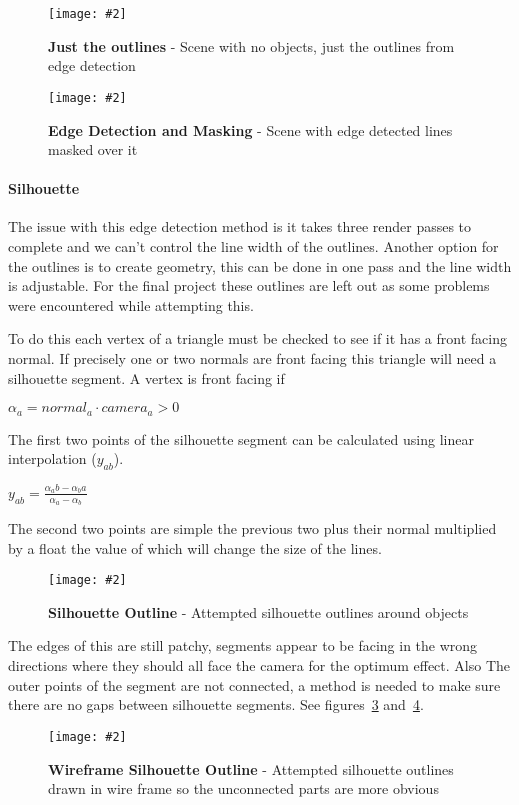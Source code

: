 \documentclass[10pt, a4paper]{article}
\newcommand{\figuremacro}[5]{
    \begin{figure}[#1]
        \centering
        \texttt{[image: \#2]}
        \caption[#3]{\textbf{#3}#4}
        \label{fig:#2}
    \end{figure}
}
\begin{document}
	 \figuremacro{h}{outlines}{Just the outlines}{ - Scene with no objects, just the outlines from edge detection}{1.0}
	 
	 \figuremacro{h}{edges}{Edge Detection and Masking}{ - Scene with edge detected lines masked over it}{1.0}
	 
	 \paragraph{Silhouette}
	 
	 The issue with this edge detection method is it takes three render passes to complete and we can't control the line width of the outlines. Another option for the outlines is to create geometry, this can be done in one pass and the line width is adjustable\cite{Outlines}. For the final project these outlines are left out as some problems were encountered while attempting this.
	 
	 To do this each vertex of a triangle must be checked to see if it has a front facing normal. If precisely one or two normals are front facing this triangle will need a silhouette segment. A vertex is front facing if
	 
	 	{\centering\(
	 	\alpha_{a} = normal_{a} \cdotp camera_{a} > 0
	 	\)\par}
	 
	 The first two points of the silhouette segment can be calculated using linear interpolation ({\(y_{ab}\)}).
	 
	 	{\centering \Large\(
	 	y_{ab} = \frac{\alpha_{a}b - \alpha_{b}a}{\alpha_{a} - \alpha_{b}}
	 	\)\par}
 	
 	The second two points are simple the previous two plus their normal multiplied by a float the value of which will change the size of the lines. 
 	
 	\figuremacro{h}{silhouetted}{Silhouette Outline}{ - Attempted silhouette outlines around objects}{1.0}
 	
 	The edges of this are still patchy, segments appear to be facing in the wrong directions where they should all face the camera for the optimum effect. Also The outer points of the segment are not connected, a method is needed to make sure there are no gaps between silhouette segments. See figures~\ref{fig:silhouetted} and~\ref{fig:wireframeoutlines}.
 	
 	 \figuremacro{h}{wireframeoutlines}{Wireframe Silhouette Outline}{ - Attempted silhouette outlines drawn in wire frame so the unconnected parts are more obvious}{1.0}
 	 
\end{document}
